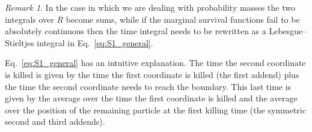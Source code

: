 \documentclass[a4paper,11pt]{amsart}
\theoremstyle{remark}
\newtheorem{remark}{Remark}
\begin{document}
  \begin{remark}
    In the case in which we are dealing with probability masses the two integrals over $R$ become sums, while if the marginal survival functions fail to be absolutely continuous then the time integral needs to be rewritten as a Lebesgue–Stieltjes integral in Eq.~\eqref{eq:S1_general}.
  \end{remark}
Eq.~\eqref{eq:S1_general} has an intuitive explanation. The time the second coordinate is killed is given by the time the first coordinate is killed (the first addend) plus the time the second coordinate needs to reach the boundary. This last time is given by the average over the time the first coordinate is killed and the average over the position of the remaining particle at the first killing time (the symmetric second and third addends).
\end{document}
